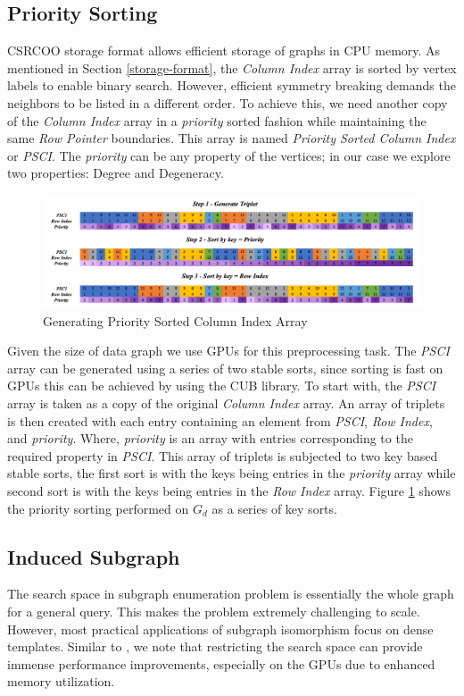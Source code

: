 \subsection{Priority Sorting}\label{sec:prio-sorting}
CSRCOO storage format allows efficient storage of graphs in CPU memory.
As mentioned in Section \ref{storage-format}, the \textit{Column Index} array is sorted by vertex labels to enable binary search.
However, efficient symmetry breaking demands the neighbors to be listed in a different order.
To achieve this, we need another copy of the \textit{Column Index} array in a \textit{priority} sorted fashion while maintaining the same \textit{Row Pointer} boundaries. This array is named \textit{Priority Sorted Column Index} or \textit{PSCI}.
The \textit{priority} can be any property of the vertices; in our case we explore two properties: Degree and Degeneracy.
\begin{figure}
    \includegraphics[width=\textwidth]{fig/LR/prio-sorting.png}
    \caption{Generating Priority Sorted Column Index Array }
    \label{fig:prio-sorting}
\end{figure}
Given the size of data graph we use GPUs for this preprocessing task.
The \textit{PSCI} array can be generated using a series of two stable sorts, since sorting is fast on GPUs this can be achieved by using the CUB library.
To start with, the \textit{PSCI} array is taken as a copy of the original \textit{Column Index} array.
An array of triplets is then created with each entry containing an element from \textit{PSCI}, \textit{Row Index}, and \textit{priority}. Where, \textit{priority} is an array with entries corresponding to the required property in \textit{PSCI}.
This array of triplets is subjected to two key based stable sorts, the first sort is with the keys being entries in the \textit{priority} array while second sort is with the keys being entries in the \textit{Row Index} array. Figure \ref{fig:prio-sorting} shows the priority sorting performed on $G_d$ as a series of key sorts.

\subsection{Induced Subgraph}\label{encoding}
The search space in subgraph enumeration problem is essentially the whole graph for a general query.
This makes the problem extremely challenging to scale.
However, most practical applications of subgraph isomorphism focus on dense templates.
Similar to \cite{mohammad_K-clique}, we note that restricting the search space can provide immense performance improvements, especially on the GPUs due to enhanced memory utilization.


